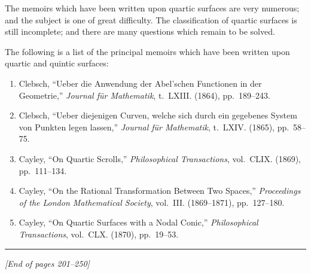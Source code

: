 \documentclass[12pt,a4paper]{article}
\theoremstyle{plain}
\theoremstyle{definition}
\theoremstyle{remark}
\begin{document}
\noindent The memoirs which have been written upon quartic surfaces are very numerous; and the subject is one of great difficulty. The classification of quartic surfaces is still incomplete; and there are many questions which remain to be solved.

\noindent The following is a list of the principal memoirs which have been written upon quartic and quintic surfaces:

\begin{enumerate}
\item[1.] Clebsch, ``Ueber die Anwendung der Abel'schen Functionen in der Geometrie,'' \textit{Journal f\"ur Mathematik}, t.~LXIII. (1864), pp.~189--243.
\item[2.] Clebsch, ``Ueber diejenigen Curven, welche sich durch ein gegebenes System von Punkten legen lassen,'' \textit{Journal f\"ur Mathematik}, t.~LXIV. (1865), pp.~58--75.
\item[3.] Cayley, ``On Quartic Scrolls,'' \textit{Philosophical Transactions}, vol.~CLIX. (1869), pp.~111--134.
\item[4.] Cayley, ``On the Rational Transformation Between Two Spaces,'' \textit{Proceedings of the London Mathematical Society}, vol.~III. (1869--1871), pp.~127--180.
\item[5.] Cayley, ``On Quartic Surfaces with a Nodal Conic,'' \textit{Philosophical Transactions}, vol.~CLX. (1870), pp.~19--53.
\end{enumerate}

\vspace{2em}
\noindent\rule{\textwidth}{0.4pt}
\begin{center}
\textit{[End of pages 201--250]}
\end{center}
\end{document}
